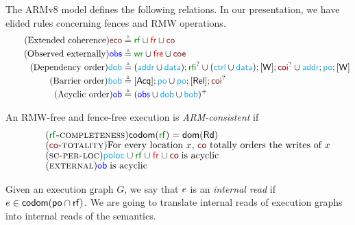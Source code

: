 The ARMv8 model defines the following relations.
In our presentation, we have elided rules concerning fences and RMW operations.
\begin{align*}
  \tag{Extended coherence}
  {\reco} &\eqdef {\rrf} \cup {\rfr} \cup {\rco}
  \\
  \tag{Observed externally}
  {\robs} &\eqdef \smash{
    {\rrfe} \cup {\rfre} \cup {\rcoe}
  }
  \\
  \tag{Dependency order}
  {\rdob} &\eqdef\smash{
    ({\raddr}\cup{\rdata}); {\rrfi}^?
    \cup ({\rctrl}\cup{\rdata}); {\IDW}; {\rcoi}^?
    \cup {\raddr}; {\rpox}; {\IDW}
  }
  \\
  \tag{Barrier order}
  {\rbob} &\eqdef\smash{
    {\IDAcq}; {\rpox}
    \cup {\rpox};{\IDRel}; {\rcoi}^?
  }
  \\
  \tag{Acyclic order}
  {\rob} &\eqdef\smash{
    ({\robs} \cup {\rdob} \cup {\rbob})^+
  }
\end{align*}
\begin{definition}
  An RMW-free and fence-free execution is \emph{ARM-consistent} if
  \begin{align*}&
    \tag{\textsc{$\rrfx$-completeness}}\label{rf-comp}
    \fcodom(\rrfx)=\fdom(\rreads)
    \\[-1ex]&
    \tag{\textsc{$\rco$-totality}}\label{co-tot}
    \text{For every location $\aLoc$, $\rco$ totally orders the writes of $\aLoc$}  
    \\[-1ex]&
    \tag{\textsc{sc-per-loc}}\label{sc-per-loc}
    {\rpoloc} \cup {\rrfx} \cup {\rfr} \cup {\rco}\;\text{is acyclic}
    \\[-1ex]&
    \tag{\textsc{external}}\label{external}
    {\rob}\;\text{is acyclic}
  \end{align*}
\end{definition}



Given an execution graph $G$, we say that $e$ is an \emph{internal read} if
$e\in\mathsf{codom}(\mathsf{po}\cap \mathsf{rf})$.    We are going to translate internal reads of execution graphs into internal reads of the semantics.  

